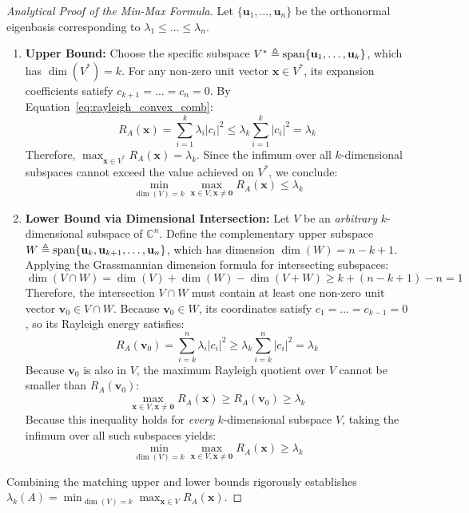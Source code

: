 \begin{proof}[Analytical Proof of the Min-Max Formula]
Let $\{\mathbf{u}_1, \dots, \mathbf{u}_n\}$ be the orthonormal eigenbasis corresponding to $\lambda_1 \le \dots \le \lambda_n$.
\begin{enumerate}
    \item \textbf{Upper Bound:} Choose the specific subspace $V^* \triangleq \operatorname{span}\{\mathbf{u}_1, \dots, \mathbf{u}_k\}$, which has $\dim(V^*) = k$. For any non-zero unit vector $\mathbf{x} \in V^*$, its expansion coefficients satisfy $c_{k+1} = \dots = c_n = 0$. By Equation~\eqref{eq:rayleigh_convex_comb}:
    \begin{equation*}
    R_A(\mathbf{x}) = \sum_{i=1}^k \lambda_i |c_i|^2 \le \lambda_k \sum_{i=1}^k |c_i|^2 = \lambda_k
    \end{equation*}
    Therefore, $\max_{\mathbf{x} \in V^*} R_A(\mathbf{x}) = \lambda_k$. Since the infimum over all $k$-dimensional subspaces cannot exceed the value achieved on $V^*$, we conclude:
    \begin{equation*}
    \min_{\dim(V) = k} \max_{\mathbf{x} \in V, \mathbf{x} \ne \mathbf{0}} R_A(\mathbf{x}) \le \lambda_k
    \end{equation*}
    \item \textbf{Lower Bound via Dimensional Intersection:} Let $V$ be an \emph{arbitrary} $k$-dimensional subspace of $\mathbb{C}^n$. Define the complementary upper subspace $W \triangleq \operatorname{span}\{\mathbf{u}_k, \mathbf{u}_{k+1}, \dots, \mathbf{u}_n\}$, which has dimension $\dim(W) = n - k + 1$.
    Applying the Grassmannian dimension formula for intersecting subspaces:
    \begin{equation*}
    \dim(V \cap W) = \dim(V) + \dim(W) - \dim(V + W) \ge k + (n - k + 1) - n = 1
    \end{equation*}
    Therefore, the intersection $V \cap W$ must contain at least one non-zero unit vector $\mathbf{v}_0 \in V \cap W$.
    Because $\mathbf{v}_0 \in W$, its coordinates satisfy $c_1 = \dots = c_{k-1} = 0$, so its Rayleigh energy satisfies:
    \begin{equation*}
    R_A(\mathbf{v}_0) = \sum_{i=k}^n \lambda_i |c_i|^2 \ge \lambda_k \sum_{i=k}^n |c_i|^2 = \lambda_k
    \end{equation*}
    Because $\mathbf{v}_0$ is also in $V$, the maximum Rayleigh quotient over $V$ cannot be smaller than $R_A(\mathbf{v}_0)$:
    \begin{equation*}
    \max_{\mathbf{x} \in V, \mathbf{x} \ne \mathbf{0}} R_A(\mathbf{x}) \ge R_A(\mathbf{v}_0) \ge \lambda_k
    \end{equation*}
    Because this inequality holds for \emph{every} $k$-dimensional subspace $V$, taking the infimum over all such subspaces yields:
    \begin{equation*}
    \min_{\dim(V) = k} \max_{\mathbf{x} \in V, \mathbf{x} \ne \mathbf{0}} R_A(\mathbf{x}) \ge \lambda_k
    \end{equation*}
\end{enumerate}
Combining the matching upper and lower bounds rigorously establishes $\lambda_k(A) = \min_{\dim(V) = k} \max_{\mathbf{x} \in V} R_A(\mathbf{x})$.
\end{proof}

